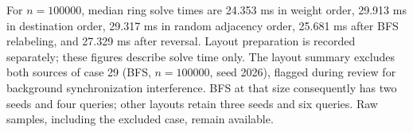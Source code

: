 For $n=100000$, median ring solve times are 24.353 ms in weight order, 29.913 ms in destination order, 29.317 ms in random adjacency order, 25.681 ms after BFS relabeling, and 27.329 ms after reversal. Layout preparation is recorded separately; these figures describe solve time only.
The layout summary excludes both sources of case 29 (BFS, $n=100000$, seed 2026), flagged during review for background synchronization interference. BFS at that size consequently has two seeds and four queries; other layouts retain three seeds and six queries. Raw samples, including the excluded case, remain available.
